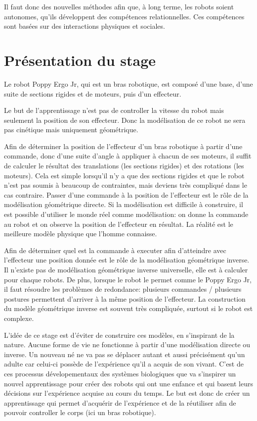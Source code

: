\documentclass[11pt,french]{report}
\begin{document}
Il faut donc des nouvelles méthodes afin que, à long terme, les robots soient autonomes, qu'ils développent des compétences relationnelles.
Ces compétences sont basées sur des interactions physiques et sociales.

\chapter{Présentation du stage}

Le robot Poppy Ergo Jr, qui est un bras robotique, est composé d'une base, d'une suite de sections rigides et de moteurs, puis d'un effecteur.

Le but de l'apprentissage n'est pas de controller la vitesse du robot mais seulement la position de son effecteur.
Donc la modélisation de ce robot ne sera pas cinétique mais uniquement géométrique.

Afin de déterminer la position de l'effecteur d'un bras robotique à partir d'une commande, donc d'une suite d'angle à appliquer à chacun de ses moteurs, il suffit de calculer le résultat des translations (les sections rigides) et des rotations (les moteurs).
Cela est simple lorsqu'il n'y a que des sections rigides et que le robot n'est pas soumis à beaucoup de contraintes, mais deviens très compliqué dans le cas contraire.
Passer d'une commande à la position de l'effecteur est le rôle de la modélisation géométrique directe.
Si la modélisation est difficile à construire, il est possible d'utiliser le monde réel comme modélisation: on donne la commande au robot et on observe la position de l'effecteur en résultat.
La réalité est le meilleure modèle physique que l'homme connaisse.

Afin de déterminer quel est la commande à executer afin d'atteindre avec l'effecteur une position donnée est le rôle de la modélisation géométrique inverse.
Il n'existe pas de modélisation géométrique inverse universelle, elle est à calculer pour chaque robots.
De plus, lorsque le robot le permet comme le Poppy Ergo Jr, il faut résoudre les problèmes de redondance: plusieurs commandes / plusieurs postures permettent d'arriver à la même position de l'effecteur.
La construction du modèle géométrique inverse est souvent très compliquée, surtout si le robot est complexe.

L'idée de ce stage est d'éviter de construire ces modèles, en s'inspirant de la nature.
Aucune forme de vie ne fonctionne à partir d'une modélisation directe ou inverse.
Un nouveau né ne va pas se déplacer autant et aussi précisément qu'un adulte car celui-ci possède de l'expérience qu'il a acquis de son vivant.
C'est de ces processus dévelopementaux des systèmes biologiques que va s'inspirer un nouvel apprentissage pour créer des robots qui ont une enfance et qui basent leurs décisions sur l'expérience acquise au cours du temps.
Le but est donc de créer un apprentissage qui permet d'acquérir de l'expérience et de la réutiliser afin de pouvoir controller le corps (ici un bras robotique).
\end{document}
